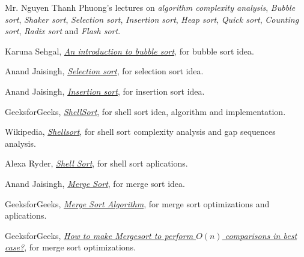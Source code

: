 \documentclass[12pt]{article}
\begin{document}
\begin{thebibliography}{99}
     Mr. Nguyen Thanh Phuong's lectures on \emph{algorithm complexity analysis}, \emph{Bubble sort}, \emph{Shaker sort}, \emph{Selection sort}, \emph{Insertion sort}, \emph{Heap sort}, \emph{Quick sort}, \emph{Counting sort}, \emph{Radix sort} and \emph{Flash sort}.

     Karuna Sehgal, \href{https://medium.com/karuna-sehgal/an-introduction-to-bubble-sort-d85273acfcd8#:~:text=Bubble%20Sort%20is%20a%20sorting,exist%20in%20the%20wrong%20order.}{\emph{An introduction to bubble sort}}, for bubble sort idea.

     Anand Jaisingh, \href{https://www.hackerearth.com/practice/algorithms/sorting/selection-sort/tutorial/#:~:text=The%20Selection%20sort%20algorithm%20is,position%20in%20a%20sorted%20array.}{\emph{Selection sort}}, for selection sort idea.
    
     Anand Jaisingh, \href{https://www.hackerearth.com/practice/algorithms/sorting/insertion-sort/tutorial/#:~:text=Insertion%20sort%20is%20based%20on,belongs%20in%20a%20sorted%20array.}{\emph{Insertion sort}}, for insertion sort idea.

     GeeksforGeeks, \href{https://www.geeksforgeeks.org/shellsort/}{\emph{ShellSort}}, for shell sort idea, algorithm and implementation.

     Wikipedia, \href{https://en.wikipedia.org/wiki/Shellsort}{\emph{Shellsort}}, for shell sort complexity analysis and gap sequences analysis.

     Alexa Ryder, \href{https://iq.opengenus.org/shell-sort/#applications}{\emph{Shell Sort}}, for shell sort aplications.

     Anand Jaisingh, \href{https://www.hackerearth.com/practice/algorithms/sorting/merge-sort/tutorial/#:~:text=Merge%20sort%20is%20a%20divide,results%20into%20a%20sorted%20list.}{\emph{Merge Sort}}, for merge sort idea.

     GeeksforGeeks, \href{https://www.geeksforgeeks.org/merge-sort/}{\emph{Merge Sort Algorithm}}, for merge sort optimizations and aplications.

     GeeksforGeeks, \href{https://www.geeksforgeeks.org/make-mergesort-perform-comparisons-best-case/}{\emph{How to make Mergesort to perform $O(n)$ comparisons in best case?}}, for merge sort optimizations.


\end{thebibliography}
\end{document}
